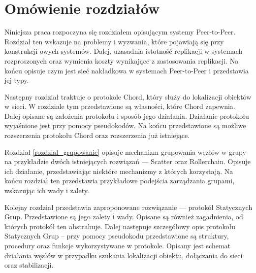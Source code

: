 \documentclass[12pt, twoside, openany]{report}
\begin{document}

\section{Omówienie rozdziałów}

Niniejsza praca rozpoczyna się rozdziałem opisującym systemy Peer-to-Peer. Rozdział ten wskazuje na problemy i wyzwania, które pojawiają się przy konstrukcji owych systemów. Dalej, uzasadnia istotność replikacji w systemach rozproszonych oraz wymienia koszty wynikające z zastosowania replikacji. Na końcu opisuje czym jest sieć nakładkowa w systemach Peer-to-Peer i przedstawia jej typy.

Następny rozdział traktuje o protokole Chord, który służy do lokalizacji obiektów w sieci. W rozdziale tym przedstawione są własności, które Chord zapewnia. Dalej opisane są założenia protokołu i sposób jego działania. Działanie protokołu wyjaśnione jest przy pomocy pseudokodów. Na końcu przedstawione są możliwe rozszerzenia protokołu Chord oraz rozszerzenia już istniejące.

Rozdział \ref{rozdzial_grupowanie} opisuje mechanizm grupowania węzłów w grupy na przykładzie dwóch istniejących rozwiązań --- Scatter oraz Rollerchain. Opisuje ich działanie, przedstawiając niektóre mechanizmy z których korzystają. Na końcu rozdział ten przedstawia przykładowe podejścia zarządzania grupami, wskazując ich wady i zalety.

Kolejny rozdział przedstawia zaproponowane rozwiązanie --- protokół Statycznych Grup. Przedstawione są jego zalety i wady. Opisane są również zagadnienia, od których protokół ten abstrahuje. Dalej następuje szczegółowy opis protokołu Statycznych Grup -- przy pomocy pseudokodu przedstawione są struktury, procedury oraz funkcje wykorzystywane w protokole. Opisany jest schemat działania węzłów w przypadku szukania lokalizacji obiektu, dołączania do sieci oraz stabilizacji.
\end{document}
